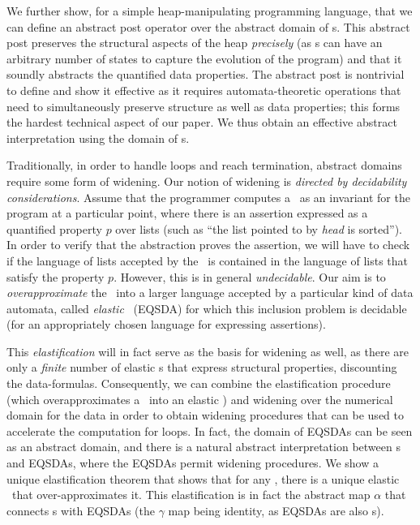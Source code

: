 \documentclass{llncs}
\newcommand{\EQSDA}{\mbox{\sc EQSDA}}
\begin{document}
We further show, for a simple heap-manipulating programming language, that we can define an abstract
post operator over the abstract domain of \QSDA s. This abstract post preserves the structural aspects of the
heap \emph{precisely} (as \QSDA s can have an arbitrary number of states to capture the evolution of the
program) and that it soundly abstracts the quantified data properties. The abstract post is nontrivial
to define and show it effective as it requires automata-theoretic operations that need to simultaneously
preserve structure as well as data properties; this forms the hardest technical aspect of our paper.
We thus obtain an effective abstract interpretation using the domain of \QSDA s.



Traditionally, in order to handle loops and reach termination, abstract domains require some form of widening.
Our notion of widening is \emph{directed by decidability considerations}. Assume that the programmer computes
a \QSDA\ as an invariant for the program at a particular point, where there is an assertion expressed as
a quantified property $p$ over lists (such as  ``the list pointed to by \emph{head} is sorted'').
In order to verify that the abstraction proves the assertion, we will have to check if the language of lists
accepted by the \QSDA\ is contained in the language of lists that satisfy the property $p$. However, this is in
general \emph{undecidable}. Our aim is to \emph{overapproximate} the \QSDA\ into a larger language accepted
by a particular kind of data automata, called  {\em elastic} \QSDA\ (\EQSDA) for which this inclusion problem is
decidable (for an appropriately chosen language for expressing assertions).



This \emph{elastification} will in fact serve as the basis for widening as well, as there are only a \emph{finite} number of
elastic \QSDA s that express structural properties, discounting the data-formulas. Consequently, we
can combine the elastification procedure (which overapproximates a \QSDA\ into an elastic \QSDA) and
widening over the numerical domain for the data in order to obtain widening procedures that can be
used to accelerate the computation for loops. In fact, the domain of \EQSDA s can be seen as an abstract
domain, and there is a natural abstract interpretation between \QSDA s and \EQSDA s, where the \EQSDA s permit
widening procedures. We show a unique elastification theorem that shows
that for any \QSDA, there is a unique elastic \QSDA\ that over-approximates it. This elastification is in fact
the abstract map $\alpha$ that connects \QSDA s with \EQSDA s (the $\gamma$ map being identity, as \EQSDA s are also
\QSDA s).
\end{document}
